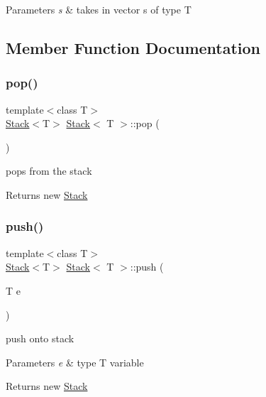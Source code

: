 \begin{DoxyParams}{Parameters}
{\em s} & takes in vector s of type T \\
\hline
\end{DoxyParams}


\subsection{Member Function Documentation}
\mbox{\label{class_stack_a79085ca78d75f61838c1c2b8f9de968d}} 
\subsubsection{\texorpdfstring{pop()}{pop()}}
{\footnotesize\ttfamily template$<$class T$>$ \\
\hyperlink{class_stack}{Stack}$<$T$>$ \hyperlink{class_stack}{Stack}$<$ T $>$\+::pop (\begin{DoxyParamCaption}{ }\end{DoxyParamCaption})}



pops from the stack 

\begin{DoxyReturn}{Returns}
new \hyperlink{class_stack}{Stack} 
\end{DoxyReturn}
\mbox{\label{class_stack_a2f702496e109485c2ce9261f0c629dd1}} 
\subsubsection{\texorpdfstring{push()}{push()}}
{\footnotesize\ttfamily template$<$class T$>$ \\
\hyperlink{class_stack}{Stack}$<$T$>$ \hyperlink{class_stack}{Stack}$<$ T $>$\+::push (\begin{DoxyParamCaption}\item[{T}]{e }\end{DoxyParamCaption})}



push onto stack 


\begin{DoxyParams}{Parameters}
{\em e} & type T variable \\
\hline
\end{DoxyParams}
\begin{DoxyReturn}{Returns}
new \hyperlink{class_stack}{Stack} 
\end{DoxyReturn}
\mbox{\label{class_stack_ab04985802f97ae3555289c865462bf7f}} 
